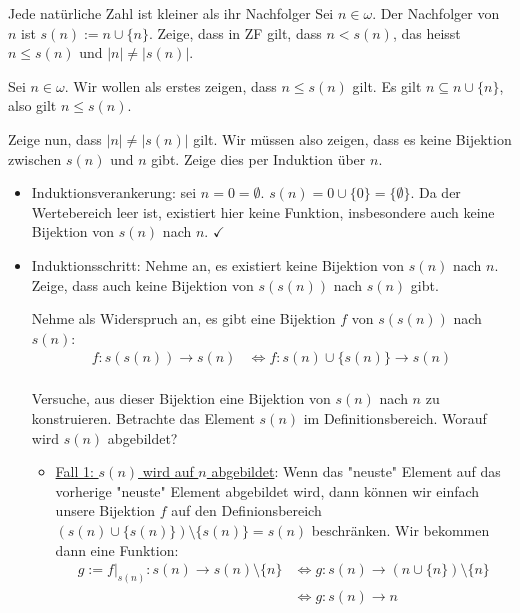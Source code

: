 \documentclass[12pt]{article}
\begin{document}
\begin{problem}[Aufgabe]{Jede natürliche Zahl ist kleiner als ihr Nachfolger}{}
    Sei $n \in \omega$. Der Nachfolger von $n$ ist $s(n) := n \cup \{n\}$. Zeige, dass in ZF gilt, dass $n < s(n)$, das heisst $n \leq s(n)$ und $|n| \neq |s(n)|$.
\end{problem}

Sei $n \in \omega$. Wir wollen als erstes zeigen, dass $n \leq s(n)$ gilt. Es gilt $n \subseteq n \cup \{n\}$, also gilt $n \leq s(n)$.

Zeige nun, dass $|n| \neq |s(n)|$ gilt. Wir müssen also zeigen, dass es keine Bijektion zwischen $s(n)$ und $n$ gibt. Zeige dies per Induktion über $n$.

\begin{itemize}
    \item Induktionsverankerung: sei $n = 0 = \emptyset$. $s(n) = 0 \cup \{0\} = \{\emptyset\}$. Da der Wertebereich leer ist, existiert hier keine Funktion, insbesondere auch keine Bijektion von $s(n)$ nach $n$. $\checkmark$
    \item Induktionsschritt: Nehme an, es existiert keine Bijektion von $s(n)$ nach $n$. Zeige, dass auch keine Bijektion von $s(s(n))$ nach $s(n)$ gibt. 
    
    Nehme als Widerspruch an, es gibt eine Bijektion $f$ von $s(s(n))$ nach $s(n)$:
    $$
    \begin{aligned}
        f: s(s(n)) \rightarrow s(n) &\iff f: s(n) \cup \{s(n)\} \rightarrow s(n) \\
    \end{aligned}
    $$

    Versuche, aus dieser Bijektion eine Bijektion von $s(n)$ nach $n$ zu konstruieren. Betrachte das Element $s(n)$ im Definitionsbereich. Worauf wird $s(n)$ abgebildet?
    \begin{itemize}
        \item \underline{Fall 1: $s(n)$ wird auf $n$ abgebildet}: Wenn das "neuste" Element auf das vorherige  "neuste" Element abgebildet wird, dann können wir einfach unsere Bijektion $f$ auf den Definionsbereich $\left(s(n) \cup \{s(n)\}\right) \setminus \{ s(n) \} = s(n)$ beschränken. Wir bekommen dann eine Funktion:
        $$
        \begin{aligned}
            g := f|_{s(n)} : s(n) \rightarrow s(n) \setminus \{n\} &\iff g : s(n) \rightarrow \left(n \cup \{n\}\right) \setminus \{n\} \\
            &\iff g : s(n) \rightarrow n \\
        \end{aligned}
        $$


\end{itemize}
\end{itemize}
\end{document}
